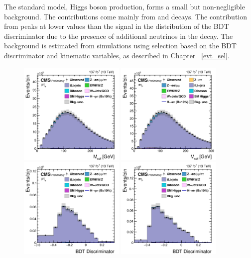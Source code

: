 The standard model, Higgs boson production, forms a small but non-negligible background. The contributions come mainly from \Htt and \HWW decays. The contribution from \HWW peaks at lower values than the signal in the distribution of the BDT discriminator due to the presence of additional neutrinos in the decay. The background is estimated from simulations using selection based on the BDT discriminator and kinematic variables, as described in Chapter ~\ref{evt_sel}.

\begin{figure}[htbp!]
  \centering
  \includegraphics[width=0.45\textwidth]{plots/chapter7/Fake/mue/TT.png}
  \includegraphics[width=0.45\textwidth]{plots/chapter7/Fake/emu/TT.png}
  \includegraphics[width=0.45\textwidth]{plots/chapter7/Fake/mue/TTBDT.png}
  \includegraphics[width=0.45\textwidth]{plots/chapter7/Fake/emu/TTBDT.png}

\end{figure}
